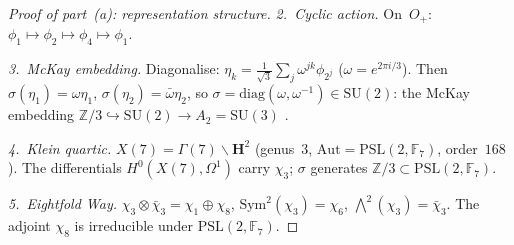 \begin{proof}[Proof of part~(a): representation structure]
\emph{2.\ Cyclic action.}
On~$O_+$: $\phi_1 \mapsto \phi_2 \mapsto \phi_4 \mapsto \phi_1$.

\emph{3.\ McKay embedding.}
Diagonalise: $\eta_k = \tfrac{1}{\sqrt{3}}\sum_j \omega^{jk}\phi_{2^j}$
($\omega = e^{2\pi i/3}$).
Then $\sigma(\eta_1) = \omega\eta_1$,
$\sigma(\eta_2) = \bar\omega\eta_2$, so
$\sigma = \mathrm{diag}(\omega, \omega^{-1}) \in \mathrm{SU}(2)$:
the McKay embedding $\mathbb{Z}/3 \hookrightarrow \mathrm{SU}(2)
\to A_2 = \mathrm{SU}(3)$
\citep{McKay1980, GonzalezSprinberg1983}.

\emph{4.\ Klein quartic.}
$X(7) = \Gamma(7)\backslash\mathbf{H}^2$ (genus~$3$,
$\mathrm{Aut} = \mathrm{PSL}(2,\mathbb{F}_7)$, order~$168$).
The differentials $H^0(X(7),\Omega^1)$ carry $\chi_3$;
$\sigma$ generates
$\mathbb{Z}/3 \subset \mathrm{PSL}(2,\mathbb{F}_7)$.

\emph{5.\ Eightfold Way.}
$\chi_3 \otimes \bar\chi_3 = \chi_1 \oplus \chi_8$,
$\mathrm{Sym}^2(\chi_3) = \chi_6$,
$\bigwedge^2(\chi_3) = \bar\chi_3$.
The adjoint $\chi_8$ is irreducible under
$\mathrm{PSL}(2,\mathbb{F}_7)$.
\end{proof}

